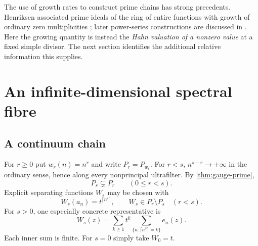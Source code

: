 \documentclass[11pt,letterpaper]{article}
\numberwithin{equation}{section}
\theoremstyle{definition}
\theoremstyle{remark}
\begin{document}
The use of growth rates to construct prime chains has strong precedents.
Henriksen associated prime ideals of the ring of entire functions with
growth of ordinary zero multiplicities \cite{Henriksen53}; later
power-series constructions are discussed in \cite{KangToan}. Here the
growing quantity is instead the \emph{Hahn valuation of a nonzero value}
at a fixed simple divisor. The next section identifies the additional
relative information this supplies.

\section{An infinite-dimensional spectral fibre}\label{sec:fibres}

\subsection{A continuum chain}
For $r\ge0$ put $w_r(n)=n^r$ and write $P_r=P_{w_r}$. For $r<s$,
$n^{s-r}\to+\infty$ in the ordinary sense, hence along every
nonprincipal ultrafilter. By \cref{thm:gauge-prime},
\begin{equation}\label{eq:prime-chain}
 P_s\subsetneq P_r\qquad(0\le r<s).
\end{equation}
Explicit separating functions $W_s$ may be chosen with
\begin{equation}\label{eq:prime-witness}
 W_s(a_n)=t^{\lceil n^s\rceil},\qquad
 W_s\in P_r\setminus P_s\quad(r<s).
\end{equation}
For $s>0$, one especially concrete representative is
\[
 W_s(z)=\sum_{k\ge1}t^k
          \sum_{\{n:\lceil n^s\rceil=k\}}e_n(z).
\]
Each inner sum is finite. For $s=0$ simply take $W_0=t$.
\end{document}
